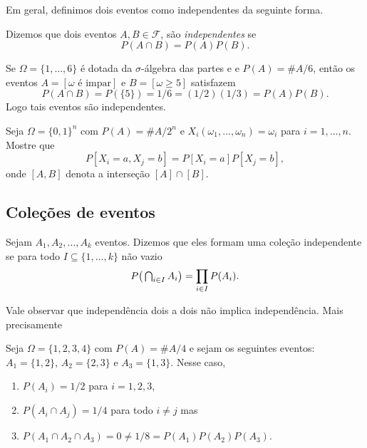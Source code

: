 Em geral, definimos dois eventos como independentes da seguinte forma.

\begin{definition}
  Dizemos que dois eventos $A, B \in \mathcal{F}$, são \emph{independentes}  se
  \begin{equation}
    P(A \cap B) = P(A) P(B).
  \end{equation}
\end{definition}

\begin{example}
  Se $\Omega = \{1, \dots, 6\}$ é dotada da $\sigma$-álgebra das partes e e $P(A) = \#A/6$, então os eventos $A = [\omega \text{ é impar}]$ e $B = [\omega \geq 5]$ satisfazem
  \begin{equation}
    P(A \cap B) = P(\{5\}) = 1/6 = (1/2) (1/3) = P(A) P(B).
  \end{equation}
  Logo tais eventos são independentes.
\end{example}

\begin{exercise}
  Seja $\Omega = \{0,1\}^n$ com $P(A) = \#A/2^n$ e $X_i(\omega_1, \dots, \omega_n) = \omega_i$ para $i = 1, \dots, n$.
  Mostre que
  \begin{equation}
    P[X_i = a, X_j = b] = P[X_i = a] P[X_j = b],
  \end{equation}
  onde $[A, B]$ denota a interseção $[A] \cap [B]$.
\end{exercise}

\subsection{Coleções de eventos}


\begin{definition}
  Sejam $A_1, A_2, \dots, A_k$ eventos.
  Dizemos que eles formam uma coleção independente  se para todo $I \subseteq \{1, \dots, k\}$ não vazio
  \begin{equation}
    P\big( \operatorname*{{\textstyle \bigcap}}\nolimits_{i \in I} A_i \big) =  \prod\limits_{i \in I} P(A_i).
  \end{equation}
\end{definition}

Vale observar que independência dois a dois não implica independência.
Mais precisamente
\begin{example}
  Seja $\Omega = \{1,2,3,4\}$ com $P(A) = \# A/4$ e sejam os seguintes eventos: $A_1 = \{1,2\}$, $A_2 = \{2,3\}$ e $A_3 = \{1,3\}$.
  Nesse caso,
  \begin{enumerate}[\quad a)]
  \item $P(A_i) = 1/2$ para $i = 1, 2, 3$,
  \item $P(A_i \cap A_j) = 1/4$ para todo $i \neq j$ mas
  \item $P(A_1 \cap A_2 \cap A_3) = 0 \neq 1/8 = P(A_1) P(A_2) P(A_3)$.
  \end{enumerate}
\end{example}

